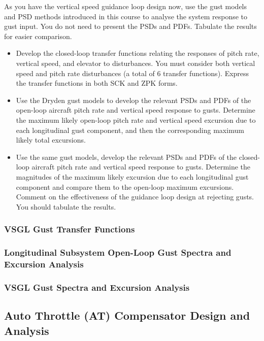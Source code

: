 As you have the vertical speed guidance loop design now, use the gust models and PSD methods introduced in this course to analyse the system response to gust input. You do not need to present the PSDs and PDFs. Tabulate the results for easier comparison.
\begin{itemize}
\item Develop the closed-loop transfer functions relating the responses of pitch rate, vertical speed, and elevator to disturbances. You must consider both vertical speed and pitch rate disturbances (a total of 6 transfer functions). Express the transfer functions in both SCK and ZPK forms.
\item Use the Dryden gust models to develop the relevant PSDs and PDFs of the open-loop aircraft pitch rate and vertical speed response to gusts. Determine the maximum likely open-loop pitch rate and vertical speed excursion due to each longitudinal gust component, and then the corresponding maximum likely total excursions.
\item Use the same gust models, develop the relevant PSDs and PDFs of the closed-loop aircraft pitch rate and vertical speed response to gusts. Determine the magnitudes of the maximum likely excursion due to each longitudinal gust component and compare them to the open-loop maximum excursions. Comment on the effectiveness of the guidance loop design at rejecting gusts. You should tabulate the results.
\end{itemize}
\subsubsection{VSGL Gust Transfer Functions}

\subsubsection{Longitudinal Subsystem Open-Loop Gust Spectra and Excursion
Analysis}

\subsubsection{VSGL Gust Spectra and Excursion Analysis}

\subsection{Auto Throttle (AT) Compensator Design and Analysis}


